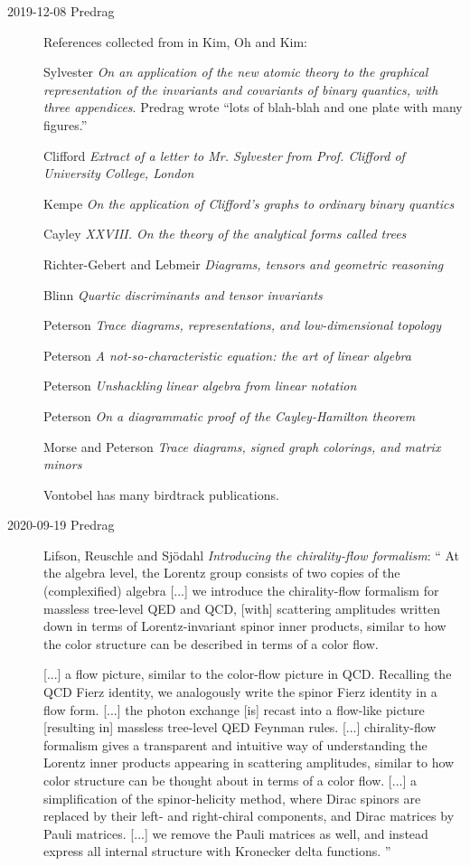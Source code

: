 \begin{description}
\item[2019-12-08 Predrag]
References collected from in Kim, Oh and Kim:

Sylvester {\em On an application of the new atomic
theory to the graphical representation of the invariants and covariants
of binary quantics, with three appendices}.
Predrag wrote
``lots of blah-blah and one plate with many figures.''

Clifford {\em Extract of a letter to {Mr. Sylvester}
from {Prof. Clifford} of {University College, London}}

Kempe
{\em On the application of {Clifford}'s graphs to ordinary binary quantics}

Cayley
{\em {XXVIII}. {On} the theory of the analytical forms called trees}

Richter-Gebert and Lebmeir
{\em Diagrams, tensors and geometric reasoning}

Blinn
{\em Quartic discriminants and tensor invariants}

Peterson
{\em {Trace diagrams, representations, and  low-dimensional topology}}

Peterson
{\em A not-so-characteristic equation: the art of linear algebra}

Peterson
{\em Unshackling linear algebra from linear notation}

Peterson
{\em On a diagrammatic proof of the {Cayley-Hamilton} theorem}

Morse and Peterson
{\em Trace diagrams, signed graph colorings, and matrix minors}

{Vontobel} has many birdtrack publications.

\item[2020-09-19 Predrag]
Lifson, Reuschle and Sj{\"o}dahl
{\em Introducing the chirality-flow formalism}: ``
At the algebra level, the Lorentz group consists of two copies of the
(complexified)  algebra [...] we
introduce the chirality-flow formalism for massless tree-level QED and
QCD, [with] scattering amplitudes
 written down in terms of Lorentz-invariant spinor inner
products, similar to how the color structure can be described in terms of
a color flow.

[...] a flow picture, similar to the color-flow picture in QCD. Recalling
the QCD Fierz identity, we analogously write the spinor Fierz identity in
a flow form. [...] the photon exchange [is] recast into a flow-like
picture [resulting in] massless tree-level QED Feynman rules. [...]
chirality-flow formalism gives a transparent and intuitive way of
understanding the Lorentz inner products appearing in scattering
amplitudes, similar to how color structure can be thought about in terms
of a color flow. [...] a simplification of the spinor-helicity
method, where Dirac spinors are replaced by their left- and right-chiral
components, and Dirac matrices by Pauli matrices. [...] we
remove the Pauli matrices as well, and instead express all
internal structure with Kronecker delta functions.
''


\end{description}
